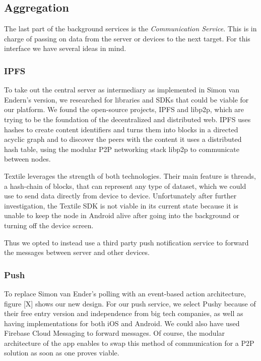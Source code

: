 \subsection{Aggregation}
The last part of the background services is the \textit{Communication Service}. This is in charge of passing on data from the server or devices to the next target. For this interface we have several ideas in mind.
 
\subsubsection{IPFS}
To take out the central server as intermediary as implemented in Simon van Endern's version, we researched for libraries and SDKs that could be viable for our platform. We found the open-source projects, IPFS and libp2p, which are trying to be the foundation of the decentralized and distributed web. IPFS uses hashes to create content identifiers and turns them into blocks in a directed acyclic graph and to discover the peers with the content it uses a distributed hash table, using the modular P2P networking stack libp2p to communicate between nodes. 

Textile leverages the strength of both technologies. Their main feature is threads, a hash-chain of blocks, that can represent any type of dataset, which we could use to send data directly from device to device. Unfortunately after further investigation, the Textile SDK is not viable in its current state because it is unable to keep the node in Android alive after going into the background or turning off the device screen.

Thus we opted to instead use a third party push notification service to forward the messages between server and other devices.

\subsubsection{Push}
To replace Simon van Ender's polling with an event-based action architecture, figure [X] shows our new design. For our push service, we select Pushy
because of their free entry version and independence from big tech companies, as well as having implementations for both iOS and Android. We could also have used Firebase Cloud Messaging to forward messages. Of course, the modular architecture of the app enables to swap this method of communication for a P2P solution as soon as one proves viable.

